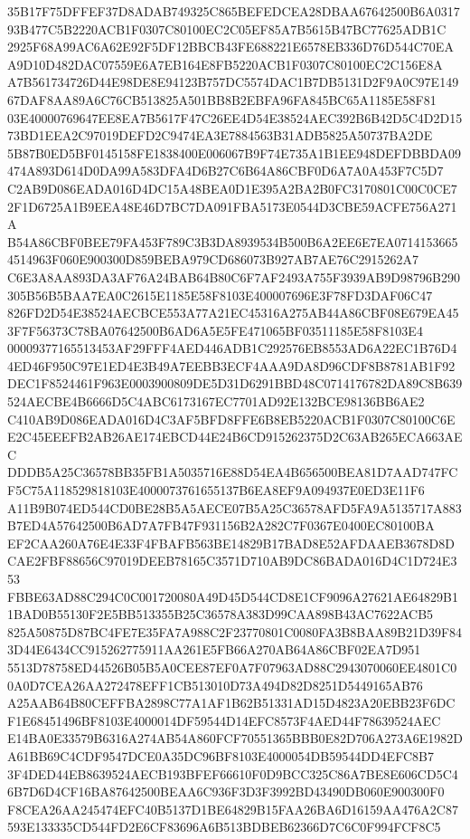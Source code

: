 \documentclass[UTF8,fontset=fandol,zihao=-4,a4paper]{ctexart}
\begin{document}
{{35B17F75DFFEF37D8ADAB749325C865BEFEDCEA28DBAA67642500B6A031793B477C5B2220ACB1F0307C80100EC2C05EF85A7B5615B47BC77625ADB1C
2925F68A99AC6A62E92F5DF12BBCB43FE688221E6578EB336D76D544C70EAA9D10D482DAC07559E6A7EB164E8FB5220ACB1F0307C80100EC2C156E8A
A7B561734726D44E98DE8E94123B757DC5574DAC1B7DB5131D2F9A0C97E14967DAF8AA89A6C76CB513825A501BB8B2EBFA96FA845BC65A1185E58F81
03E40000769647EE8EA7B5617F47C26EE4D54E38524AEC392B6B42D5C4D2D1573BD1EEA2C97019DEFD2C9474EA3E7884563B31ADB5825A50737BA2DE
5B87B0ED5BF0145158FE1838400E006067B9F74E735A1B1EE948DEFDBBDA09474A893D614D0DA99A583DFA4D6B27C6B64A86CBF0D6A7A0A453F7C5D7
C2AB9D086EADA016D4DC15A48BEA0D1E395A2BA2B0FC3170801C00C0CE72F1D6725A1B9EEA48E46D7BC7DA091FBA5173E0544D3CBE59ACFE756A271A
B54A86CBF0BEE79FA453F789C3B3DA8939534B500B6A2EE6E7EA07141536654514963F060E900300D859BEBA979CD686073B927AB7AE76C2915262A7
C6E3A8AA893DA3AF76A24BAB64B80C6F7AF2493A755F3939AB9D98796B290305B56B5BAA7EA0C2615E1185E58F8103E400007696E3F78FD3DAF06C47
826FD2D54E38524AECBCE553A77A21EC45316A275AB44A86CBF08E679EA453F7F56373C78BA07642500B6AD6A5E5FE471065BF03511185E58F8103E4
00009377165513453AF29FFF4AED446ADB1C292576EB8553AD6A22EC1B76D44ED46F950C97E1ED4E3B49A7EEBB3ECF4AAA9DA8D96CDF8B8781AB1F92
DEC1F8524461F963E0003900809DE5D31D6291BBD48C0714176782DA89C8B639524AECBE4B6666D5C4ABC6173167EC7701AD92E132BCE98136BB6AE2
C410AB9D086EADA016D4C3AF5BFD8FFE6B8EB5220ACB1F0307C80100C6EE2C45EEEFB2AB26AE174EBCD44E24B6CD915262375D2C63AB265ECA663AEC
DDDB5A25C36578BB35FB1A5035716E88D54EA4B656500BEA81D7AAD747FCF5C75A118529818103E4000073761655137B6EA8EF9A094937E0ED3E11F6
A11B9B074ED544CD0BE28B5A5AECE07B5A25C36578AFD5FA9A5135717A883B7ED4A57642500B6AD7A7FB47F931156B2A282C7F0367E0400EC80100BA
EF2CAA260A76E4E33F4FBAFB563BE14829B17BAD8E52AFDAAEB3678D8DCAE2FBF88656C97019DEEB78165C3571D710AB9DC86BADA016D4C1D724E353
FBBE63AD88C294C0C001720080A49D45D544CD8E1CF9096A27621AE64829B11BAD0B55130F2E5BB513355B25C36578A383D99CAA898B43AC7622ACB5
825A50875D87BC4FE7E35FA7A988C2F23770801C0080FA3B8BAA89B21D39F843D44E6434CC915262775911AA261E5FB66A270AB64A86CBF02EA7D951
5513D78758ED44526B05B5A0CEE87EF0A7F07963AD88C2943070060EE4801C00A0D7CEA26AA272478EFF1CB513010D73A494D82D8251D5449165AB76
A25AAB64B80CEFFBA2898C77A1AF1B62B51331AD15D4823A20EBB23F6DCF1E68451496BF8103E4000014DF59544D14EFC8573F4AED44F78639524AEC
E14BA0E33579B6316A274AB54A860FCF70551365BBB0E82D706A273A6E1982DA61BB69C4CDF9547DCE0A35DC96BF8103E4000054DB59544DD4EFC8B7
3F4DED44EB8639524AECB193BFEF66610F0D9BCC325C86A7BE8E606CD5C46B7D6D4CF16BA87642500BEAA6C936F3D3F3992BD43490DB060E900300F0
F8CEA26AA245474EFC40B5137D1BE64829B15FAA26BA6D16159AA476A2C87593E133335CD544FD2E6CF83696A6B513BDBEB62366D7C6C0F994FCF8C5
}}
\end{document}
